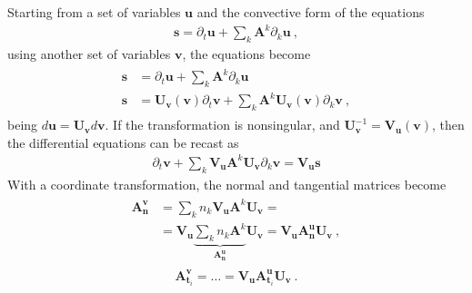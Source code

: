\documentclass[letterpaper,10pt,english]{jupyterBook}
\begin{document}
\sphinxAtStartPar
Starting from a set of variables \(\mathbf{u}\) and the convective form of the equations
\begin{equation*}
\begin{split}\mathbf{s} = \partial_t \mathbf{u} + \sum_{k} \mathbf{A}^k \partial_k \mathbf{u} \ ,\end{split}
\end{equation*}
\sphinxAtStartPar
using another set of variables \(\mathbf{v}\), the equations become
\begin{equation*}
\begin{split}\begin{aligned}
  \mathbf{s} & = \partial_t \mathbf{u} + \sum_{k} \mathbf{A}^k \partial_k \mathbf{u} \\
  \mathbf{s} & = \mathbf{U}_{\mathbf{v}}(\mathbf{v}) \partial_t \mathbf{v} + \sum_{k} \mathbf{A}^k  \mathbf{U}_{\mathbf{v}}(\mathbf{v}) \partial_k \mathbf{v} \ ,
\end{aligned}\end{split}
\end{equation*}
\sphinxAtStartPar
being \(d \mathbf{u} = \mathbf{U}_{\mathbf{v}} d \mathbf{v}\). If the transformation is non\sphinxhyphen{}singular, and \(\mathbf{U}_{\mathbf{v}}^{-1} = \mathbf{V}_{\mathbf{u}}(\mathbf{v})\), then the differential equations can be recast as
\begin{equation*}
\begin{split}\partial_t \mathbf{v} + \sum_{k} \mathbf{V}_{\mathbf{u}} \mathbf{A}^k \mathbf{U}_{\mathbf{v}} \partial_k \mathbf{v} = \mathbf{V}_{\mathbf{u}} \mathbf{s}\end{split}
\end{equation*}
\sphinxAtStartPar
With a coordinate transformation, the normal and tangential matrices become
\begin{equation*}
\begin{split}\begin{aligned}
  \mathbf{A}^{\mathbf{v}}_{\mathbf{n}} 
  & = \sum_k n_k \mathbf{V}_{\mathbf{u}} \mathbf{A}^k \mathbf{U}_{\mathbf{v}} = \\
  & =  \mathbf{V}_{\mathbf{u}} \underbrace{\sum_k n_k \mathbf{A}^k}_{ \mathbf{A}^{\mathbf{u}}_{\mathbf{n}} } \mathbf{U}_{\mathbf{v}} =   
       \mathbf{V}_{\mathbf{u}} \mathbf{A}^{\mathbf{u}}_{\mathbf{n}} \mathbf{U}_{\mathbf{v}} \ ,
\end{aligned}\end{split}
\end{equation*}\begin{equation*}
\begin{split}\mathbf{A}^{\mathbf{v}}_{\mathbf{t}_i} = \dots = \mathbf{V}_{\mathbf{u}} \mathbf{A}^{\mathbf{u}}_{\mathbf{t}_i} \mathbf{U}_{\mathbf{v}} \ .\end{split}
\end{equation*}
\end{document}
